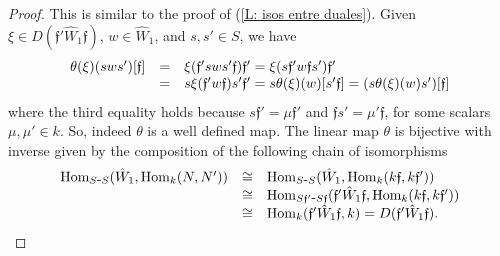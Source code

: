 \documentclass{article}
\theoremstyle{definition}
\newcommand{\Hom}{{ \rm Hom }}
\renewcommand{\frak}{\mathfrak}
\newcommand{\g}{\hbox{-}}
\begin{document}
\begin{proof} This is similar to the proof of 
(\ref{L: isos entre duales}). Given $\xi\in D(\frak{f}'\hat{W}_1\frak{f})$, $w\in \hat{W}_1$, and $s,s'\in S$, we have 
$$\begin{matrix}
\theta(\xi)(sws')[\frak{f}]
&=&
\xi(\frak{f}'sws'\frak{f})\frak{f}'=\xi(s\frak{f}'w\frak{f}s')\frak{f}'\hfill\\ &=&s\xi(\frak{f}'w\frak{f})s'\frak{f}'=
s\theta(\xi)(w)[s'\frak{f}]=(s\theta(\xi)(w)s')[\frak{f}]\hfill\\ 
\end{matrix}$$
where the third equality holds because $s\frak{f}'=\mu \frak{f}'$ and $\frak{f}s'=\mu'\frak{f}$, for some  scalars $\mu,\mu'\in k$. So, indeed $\theta$ is a well defined map.  
The linear map $\theta$ is bijective with inverse given by the composition of 
 the following chain of isomorphisms
 $$\begin{matrix}
\Hom_{S\g S}(\hat{W}_1,\Hom_k(N,N'))&\cong&
\Hom_{S\g S}(\hat{W}_1,\Hom_k(k\frak{f},k\frak{f}'))\hfill\\
&\cong&
\Hom_{S\frak{f}'\g S\frak{f}}(\frak{f}'\hat{W}_1\frak{f},\Hom_k(k\frak{f},k\frak{f}'))\hfill\\
&\cong&
\Hom_k(\frak{f}'\hat{W}_1\frak{f},k)=D(\frak{f}'\hat{W}_1\frak{f}).\hfill\\
\end{matrix}$$
 \end{proof}
\end{document}

